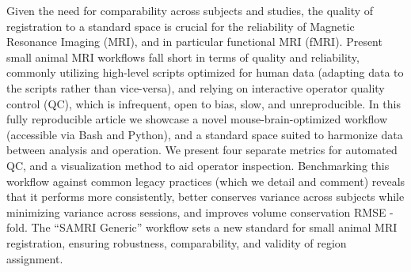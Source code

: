 Given the need for comparability across subjects and studies, the quality of registration to a standard space is crucial for the reliability of Magnetic Resonance Imaging (MRI), and in particular functional MRI (fMRI).
Present small animal MRI workflows fall short in terms of quality and reliability, commonly utilizing high-level scripts optimized for human data (adapting data to the scripts rather than vice-versa), and relying on interactive operator quality control (QC), which is infrequent, open to bias, slow, and unreproducible.
In this fully reproducible article we showcase a novel mouse-brain-optimized workflow (accessible via Bash and Python), and a standard space suited to harmonize data between analysis and operation.
We present four separate metrics for automated QC, and a visualization method to aid operator inspection.
Benchmarking this workflow against common legacy practices (which we detail and comment) reveals that it performs more consistently, better conserves variance across subjects while minimizing variance across sessions, and improves volume conservation RMSE
-fold.
The “SAMRI Generic” workflow sets a new standard for small animal MRI registration, ensuring robustness, comparability, and validity of region assignment.
